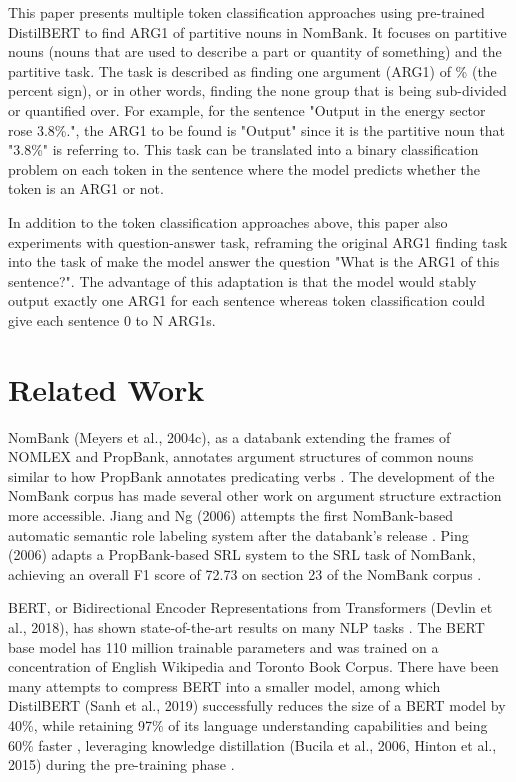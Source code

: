 \documentclass[11pt]{article}
\begin{document}
This paper presents multiple token classification approaches using pre-trained DistilBERT to find ARG1 of partitive nouns in NomBank. It focuses on partitive nouns (nouns that are used to describe a part or quantity of something) and the partitive task. The task is described as finding one argument (ARG1) of \% (the percent sign), or in other words, finding the none group that is being sub-divided or quantified over. For example, for the sentence "Output in the energy sector rose 3.8\%.", the ARG1 to be found is "Output" since it is the partitive noun that "3.8\%" is referring to. This task can be translated into a binary classification problem on each token in the sentence where the model predicts whether the token is an ARG1 or not.

In addition to the token classification approaches above, this paper also experiments with question-answer task, reframing the original ARG1 finding task into the task of make the model answer the question "What is the ARG1 of this sentence?". The advantage of this adaptation is that the model would stably output exactly one ARG1 for each sentence whereas token classification could give each sentence 0 to N ARG1s.


\section{Related Work}

NomBank (Meyers et al., 2004c), as a databank extending the frames of NOMLEX and PropBank, annotates argument structures of common nouns similar to how PropBank annotates predicating verbs \cite{meyers2004nombank}. The development of the NomBank corpus has made several other work on argument structure extraction more accessible. Jiang and Ng (2006) attempts the first NomBank-based automatic semantic role labeling system after the databank's release \cite{jiang2006semantic}. Ping (2006) adapts a PropBank-based SRL system to the SRL task of NomBank, achieving an overall F1 score of 72.73 on section 23 of the NomBank corpus \cite{ping2006investigations}.

BERT, or Bidirectional Encoder Representations from Transformers (Devlin et al., 2018), has shown state-of-the-art results on many NLP tasks \cite{devlin2018bert}. The BERT base model has 110 million trainable parameters and was trained on a concentration of English Wikipedia and Toronto Book Corpus. There have been many attempts to compress BERT into a smaller model, among which DistilBERT (Sanh et al., 2019) successfully reduces the size of a BERT model by 40\%, while retaining 97\% of its language understanding capabilities and being 60\% faster \cite{sanh2019distilbert}, leveraging  knowledge distillation (Bucila et al., 2006, Hinton et al., 2015) during the pre-training phase \cite{bucilua2006model,hinton2015distilling}.
\end{document}
